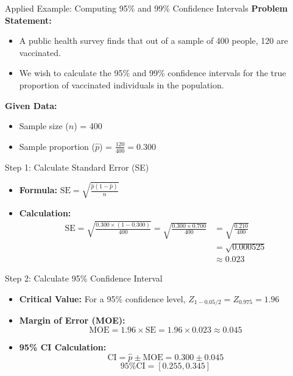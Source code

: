 \documentclass[handout]{beamer} %
\begin{document}
\begin{frame}{Applied Example: Computing 95\% and 99\% Confidence Intervals}
    \textbf{Problem Statement:}
    \begin{itemize}
        \item A public health survey finds that out of a sample of 400 people, 120 are vaccinated.
        \item We wish to calculate the 95\% and 99\% confidence intervals for the true proportion of vaccinated individuals in the population.
    \end{itemize}

    \textbf{Given Data:}
    \begin{itemize}
        \item Sample size (\( n \)) = 400
        \item Sample proportion (\( \hat{p} \)) = \(\frac{120}{400} = 0.300\)
    \end{itemize}
\end{frame}

\begin{frame}{Step 1: Calculate Standard Error (SE)}
    \begin{itemize}
        \item \textbf{Formula:} \( \text{SE} = \sqrt{\frac{\hat{p}(1 - \hat{p})}{n}} \)
        \item \textbf{Calculation:}
\begin{align*}
    \text{SE} = \sqrt{\frac{0.300 \times (1 - 0.300)}{400}} = \sqrt{\frac{0.300 \times 0.700}{400}} &= \sqrt{\frac{0.210}{400}}  \\
                                                                                                    &= \sqrt{0.000525} \\
                                                                                                    &\approx 0.023
\end{align*}


    \end{itemize}
\end{frame}

\begin{frame}{Step 2: Calculate 95\% Confidence Interval}
    \begin{itemize}
        \item \textbf{Critical Value:} For a 95\% confidence level, \( Z_{1-0.05/2} = Z_{0.975}  = 1.96 \)
        \item \textbf{Margin of Error (MOE):}
        \[
            \text{MOE} = 1.96 \times \text{SE} = 1.96 \times 0.023 \approx 0.045
        \]
        \item \textbf{95\% CI Calculation:}
        \[
            \text{CI} = \hat{p} \pm \text{MOE} = 0.300 \pm 0.045
        \]
        \[
            \text{95\% CI} = [0.255, 0.345]
        \]
    \end{itemize}
\end{frame}
\end{document}
